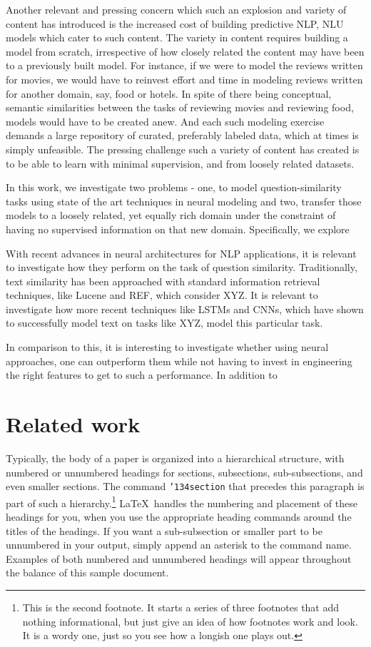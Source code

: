 \documentclass{sigkddExp}
\begin{document}
Another relevant and pressing concern which such an explosion and variety of content has introduced is the increased cost of building predictive NLP, NLU models which cater to such content. The variety in content requires building a model from scratch, irrespective of how closely related the content may have been to a previously built model. For instance, if we were to model the reviews written for movies, we would have to reinvest effort and time in modeling reviews written for another domain, say, food or hotels. In spite of there being conceptual, semantic similarities between the tasks of reviewing movies and reviewing food, models would have to be created anew. And each such modeling exercise demands a large repository of curated, preferably labeled data, which at times is simply unfeasible. The pressing challenge such a variety of content has created is to be able to learn with minimal supervision, and from loosely related datasets.

In this work, we investigate two problems - one, to model question-similarity tasks using state of the art techniques in neural modeling and two, transfer those models to a loosely related, yet equally rich domain under the constraint of having no supervised information on that new domain. Specifically, we explore 

With recent advances in neural architectures for NLP applications, it is relevant to investigate how they perform on the task of question similarity. Traditionally, text similarity has been approached with standard information retrieval techniques, like Lucene and REF, which consider XYZ. It is relevant to investigate how more recent techniques like LSTMs and CNNs, which have shown to successfully model text on tasks like XYZ, model this particular task. 

In comparison to this, it is interesting to investigate whether using neural approaches, one can outperform them while not having to invest in engineering the right features to get to such a performance. In addition to 

\section{Related work}
Typically, the body of a paper is organized
into a hierarchical structure, with numbered or unnumbered
headings for sections, subsections, sub-subsections, and even
smaller sections.  The command \texttt{{\char'134}section} that
precedes this paragraph is part of such a
hierarchy.\footnote{This is the second footnote.  It
starts a series of three footnotes that add nothing
informational, but just give an idea of how footnotes work
and look. It is a wordy one, just so you see
how a longish one plays out.} \LaTeX\ handles the numbering
and placement of these headings for you, when you use
the appropriate heading commands around the titles
of the headings.  If you want a sub-subsection or
smaller part to be unnumbered in your output, simply append an
asterisk to the command name.  Examples of both
numbered and unnumbered headings will appear throughout the
balance of this sample document.
\end{document}

